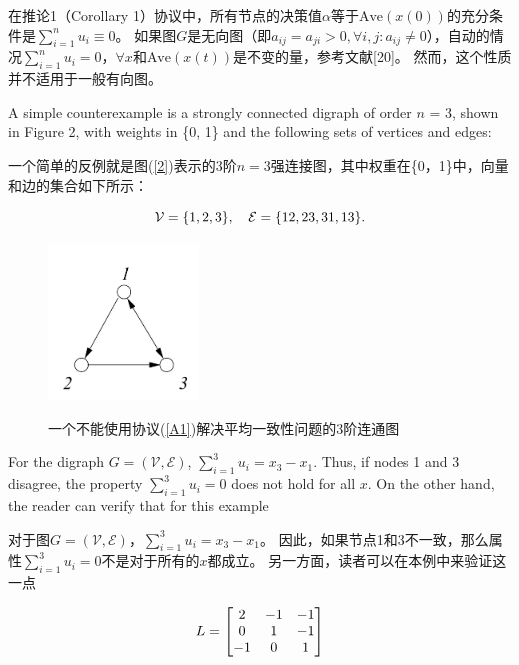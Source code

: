 \documentclass{article}
\begin{document}
\noindent 在推论1（Corollary 1）协议中，所有节点的决策值$\alpha$等于$\text{Ave}(x(0))$的充分条件是$\sum_{i=1}^{n}u_i \equiv 0$。
如果图$G$是无向图（即$a_{ij}=a_{ji} > 0,\forall i,j: a_{ij}\ne 0$），自动的情况$\sum_{i=1}^{n}u_i=0$，$\forall x$和$\text{Ave}(x(t))$是不变的量，参考文献[20]。
然而，这个性质并不适用于一般有向图。

{\color[gray]{0.5}
A simple counterexample is a strongly connected digraph of order $n$ = 3, shown in Figure 2, with weights in \{0, 1\} and the following sets of vertices and edges:
}

一个简单的反例就是图(\ref{2})表示的3阶$n=3$强连接图，其中权重在\{0，1\}中，向量和边的集合如下所示：

\begin{equation}
    \mathcal{V} = \{1, 2, 3 \},\quad \mathcal{E}=\{12, 23, 31, 13\}.
    \notag
\end{equation}

\begin{figure}[htbp]
    \centering
    \includegraphics[width=4cm]{figures/Fig2-ConnectedDigraph.jpeg}
    \label{ConnectedDigraph}
    \caption{一个不能使用协议(\ref{A1})解决平均一致性问题的3阶连通图}
\end{figure}

{\color[gray]{0.5}
For the digraph $G=(\mathcal{V}, \mathcal{E})$, $\sum_{i=1}^{3}u_i = x_3 - x_1$. 
Thus, if nodes 1 and 3 disagree, the property $\sum_{i=1}^{3}u_i = 0$ does not hold for all $x$. 
On the other hand, the reader can verify that for this example
}

对于图$G=(\mathcal{V}, \mathcal{E})$，$\sum_{i=1}^{3}u_i = x_3 - x_1$。
因此，如果节点1和3不一致，那么属性$\sum_{i=1}^{3}u_i = 0$不是对于所有的$x$都成立。
另一方面，读者可以在本例中来验证这一点

\begin{equation}
    L = \left[
    \begin{matrix}
        2 & -1 & -1 \\
        0 & 1 & -1 \\
        -1 & 0 & 1 
    \end{matrix}
    \right]
    \notag
\end{equation}
\end{document}
